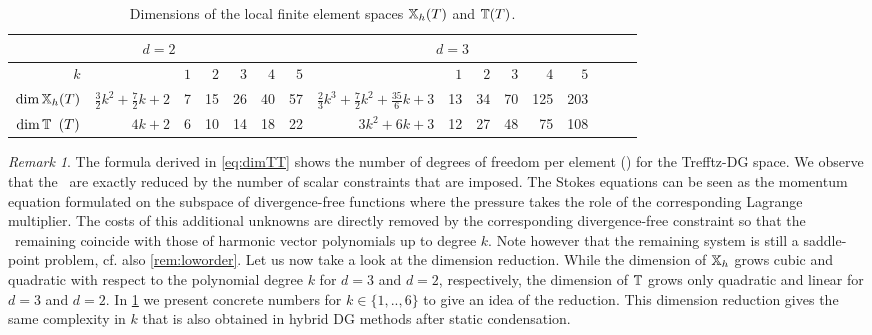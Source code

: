 \documentclass[pdflatex,sn-mathphys,Numbered]{sn-jnl}%
\theoremstyle{remark}%
\newtheorem{remark}{Remark}%
\theoremstyle{definition}%
\begin{document}
\begin{table}[!ht]
  \small
    \begin{tabular}{@{}r@{~}|@{~}r@{~}|@{~~}r@{~~}r@{~~}r@{~~}r@{~~}r@{~~}r@{~}|@{~}r@{~}@{}|@{~}r@{~~}r@{~~}r@{~~}r@{~~}r@{~~}r@{~~}r@{}}
      \toprule
        \multicolumn{7}{c}{$d=2$} & \multicolumn{6}{c}{$d=3$} \\
      \midrule
$k $   && $1$
    & $2$
    & $3$
    & $4$
    & $5$ &
    & $1$
    & $2$
    & $3$
    & $4$
    & $5$ \\
    $\dim \mathbb{X}_h(T)$ & $\frac32 k^2\!+\!\frac72 k\!+\!2$ & 7 & 15 & 26 & 40 & 57 %
    & $\frac23 k^3\!+\!\frac72 k^2\!+\!\frac{35}{6} k\!+\!3$ & 13 & 34 & 70 & 125 & 203 \\%
      $\dim \mathbb{T}_{\hphantom{h}}(T)$ & $4 k \!+\! 2$& 6 & 10 & 14 & 18 & 22 %
    & $3 k^2 + 6 k + 3 $&  12 & 27 & 48 & 75 & 108 \\%
    \bottomrule
  \end{tabular}
  \caption{Dimensions of the local finite element spaces $\mathbb{X}_h(T)$ and $\mathbb{T}(T)$.}\label{tab:localdims}
\end{table}

\begin{remark}
  The formula derived in \eqref{eq:dimTT} shows the number of degrees
  of freedom per element (\ndofs) for the Trefftz-DG space. We observe
  that the \ndofs ~are exactly reduced by the number of scalar
  constraints that are imposed. The Stokes equations can be seen as
  the momentum equation formulated on the subspace of divergence-free
  functions where the pressure takes the role of the corresponding
  Lagrange multiplier. The costs of this additional unknowns are
  directly removed by the corresponding divergence-free constraint so
  that the \ndofs ~remaining coincide with those of harmonic vector
  polynomials up to degree $k$. Note however that the remaining system
  is still a saddle-point problem, cf. also \cref{rem:loworder}. Let
  us now take a look at the dimension reduction. While the dimension
  of $\mathbb{X}_h$ grows cubic and quadratic with respect to the polynomial
  degree $k$ for $d=3$ and $d=2$, respectively, the dimension of $\mathbb{T}$
  grows only quadratic and linear for $d=3$ and $d=2$. In
  \cref{tab:localdims} we present concrete numbers for $k \in
  \{1,..,6\}$ to give an idea of the reduction. This dimension
  reduction gives the same complexity in $k$ that is also obtained in
  hybrid DG methods after static condensation.
\end{remark}
\end{document}
